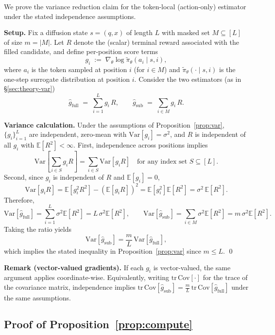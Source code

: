 \documentclass{article}
\theoremstyle{plain}
\theoremstyle{definition}
\theoremstyle{remark}
\begin{document}
We prove the variance reduction claim for the token-local (action-only) estimator under the stated independence assumptions.

\textbf{Setup.}
Fix a diffusion state $s=(q,x)$ of length $L$ with masked set $M\subseteq[L]$ of size $m=|M|$.
Let $R$ denote the (scalar) terminal reward associated with the filled candidate, and define per-position score terms
\[
g_i \;:=\; \nabla_\theta \log \tilde{\pi}_\theta(a_i \mid s,i),
\]
where $a_i$ is the token sampled at position $i$ (for $i\in M$) and $\tilde{\pi}_\theta(\cdot\mid s,i)$ is the one-step surrogate distribution at position $i$.
Consider the two estimators (as in \S\ref{sec:theory-var})
\[
\hat g_{\text{full}} \;=\; \sum_{i=1}^L g_i\,R,
\qquad
\hat g_{\text{sub}} \;=\; \sum_{i\in M} g_i\,R.
\]

\textbf{Variance calculation.}
Under the assumptions of Proposition~\ref{prop:var}, $\{g_i\}_{i=1}^L$ are independent, zero-mean with $\mathrm{Var}[g_i]=\sigma^2$, and $R$ is independent of all $g_i$ with $\mathbb{E}[R^2]<\infty$.
First, independence across positions implies
\[
\mathrm{Var}\!\left[\sum_{i\in S} g_i R\right]
=
\sum_{i\in S} \mathrm{Var}[g_i R]
\quad\text{for any index set } S\subseteq[L].
\]
Second, since $g_i$ is independent of $R$ and $\mathbb{E}[g_i]=0$,
\[
\mathrm{Var}[g_i R]
=
\mathbb{E}[g_i^2 R^2] - (\mathbb{E}[g_i R])^2
=
\mathbb{E}[g_i^2]\mathbb{E}[R^2]
=
\sigma^2\,\mathbb{E}[R^2].
\]
Therefore,
\[
\mathrm{Var}[\hat g_{\text{full}}]
=
\sum_{i=1}^L \sigma^2\mathbb{E}[R^2]
=
L\,\sigma^2\mathbb{E}[R^2],
\qquad
\mathrm{Var}[\hat g_{\text{sub}}]
=
\sum_{i\in M} \sigma^2\mathbb{E}[R^2]
=
m\,\sigma^2\mathbb{E}[R^2].
\]
Taking the ratio yields
\[
\mathrm{Var}[\hat g_{\text{sub}}]
=
\frac{m}{L}\,\mathrm{Var}[\hat g_{\text{full}}],
\]
which implies the stated inequality in Proposition~\ref{prop:var} since $m\le L$.
\qed

\textbf{Remark (vector-valued gradients).}
If each $g_i$ is vector-valued, the same argument applies coordinate-wise.
Equivalently, writing $\mathrm{tr}\,\mathrm{Cov}[\cdot]$ for the trace of the covariance matrix, independence implies
$\mathrm{tr}\,\mathrm{Cov}[\hat g_{\text{sub}}] = \frac{m}{L}\,\mathrm{tr}\,\mathrm{Cov}[\hat g_{\text{full}}]$
under the same assumptions.




\subsection{Proof of Proposition~\ref{prop:compute}}
\label{app:proof-compute}
\end{document}
